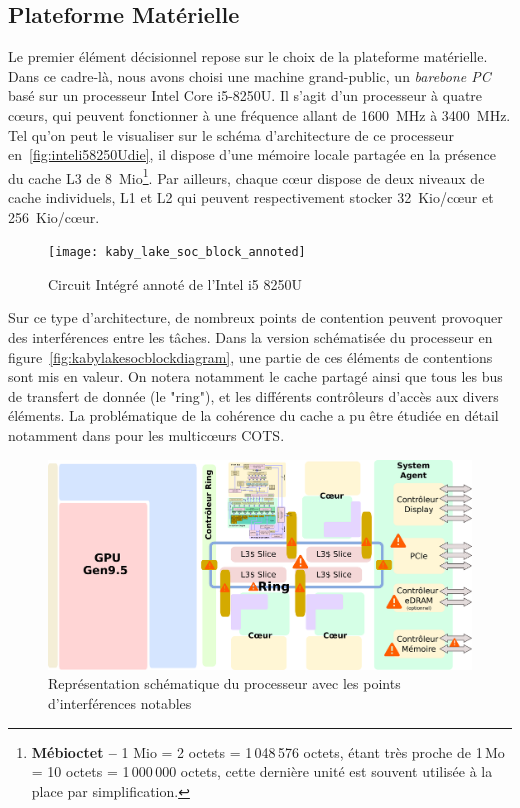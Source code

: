 \documentclass[french, a4paper, 11pt, twoside, pdftex]{StyleThese}
\begin{document}
        \subsection{Plateforme Matérielle}
        	Le premier élément décisionnel repose sur le choix de la plateforme matérielle. Dans ce cadre-là, nous avons choisi une machine grand-public, un \textit{barebone PC} basé sur un processeur Intel Core i5-8250U. Il s'agit d'un processeur à quatre cœurs, qui peuvent fonctionner à une fréquence allant de 1600~MHz à 3400~MHz. Tel qu'on peut le visualiser sur le schéma d'architecture de ce processeur en~\autoref{fig:inteli58250Udie}, il dispose d'une mémoire locale partagée en la présence du cache L3 de 8~Mio\footnote{\textbf{Mébioctet -- }1 Mio = 2 octets = 1\,048\,576 octets, étant très proche de 1\,Mo = 10 octets = 1\,000\,000 octets, cette dernière unité est souvent utilisée à la place par simplification.}. Par ailleurs, chaque cœur dispose de deux niveaux de cache individuels, L1 et L2 qui peuvent respectivement stocker 32~Kio/cœur et 256~Kio/cœur. 
       	\begin{figure}[ht]
       		\centering
       		\texttt{[image: kaby\_lake\_soc\_block\_annoted]} %
       		\caption{Circuit Intégré annoté de l'Intel i5 8250U}
       		\label{fig:inteli58250Udie}
       	\end{figure}
       
        	Sur ce type d'architecture, de nombreux points de contention peuvent provoquer des interférences entre les tâches. Dans la version schématisée du processeur en figure~\autoref{fig:kabylakesocblockdiagram}, une partie de ces éléments de contentions sont mis en valeur. On notera notamment le cache partagé ainsi que tous les bus de transfert de donnée (le "ring"), et les différents contrôleurs d'accès aux divers éléments. La problématique de la cohérence du cache a pu être étudiée en détail notamment dans \cite{boniol_identification_2019} pour les multicœurs COTS.
        	
		\begin{figure}[ht]
			\centering
			\includegraphics[width=\linewidth]{schemas/kaby_lake_soc_block_diagram}
			\captionsetup{justification=centering}
			\caption{Représentation schématique du processeur avec les points d'interférences notables}
			\label{fig:kabylakesocblockdiagram}
		\end{figure}
	
\end{document}
